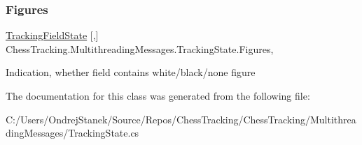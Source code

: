 \subsubsection{\texorpdfstring{Figures}{Figures}}
{\footnotesize\ttfamily \mbox{\hyperlink{namespace_chess_tracking_1_1_multithreading_messages_ac10ea87452f4fb70b8c6abe5792fcb92}{Tracking\+Field\+State}} \mbox{[},\mbox{]} Chess\+Tracking.\+Multithreading\+Messages.\+Tracking\+State.\+Figures\hspace{0.3cm}{\ttfamily [get]}, {\ttfamily [set]}}



Indication, whether field contains white/black/none figure 



The documentation for this class was generated from the following file\+:\begin{DoxyCompactItemize}
\item 
C\+:/\+Users/\+Ondrej\+Stanek/\+Source/\+Repos/\+Chess\+Tracking/\+Chess\+Tracking/\+Multithreading\+Messages/Tracking\+State.\+cs\end{DoxyCompactItemize}
